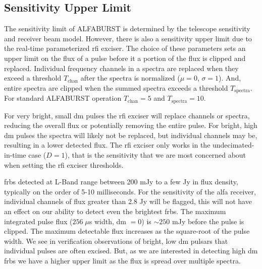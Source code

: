 \documentclass[a4paper,fleqn,usenatbib]{mnras}
\begin{document}
\subsection{Sensitivity Upper Limit}
\label{sec:upper_limit}

The sensitivity limit of ALFABURST is determined by the telescope
sensitivity and receiver beam model. However, there is also a
sensitivity upper limit due to the real-time parameterized \gls{rfi}
exciser. The choice of these parameters sets an upper limit on the
flux of a pulse before it a portion of the flux is clipped and
replaced. Individual frequency channels in a spectra are replaced when
they exceed a threshold $T_{\textrm{chan}}$ after the spectra is
normalized ($\mu=0$, $\sigma=1$). And, entire spectra are clipped when
the summed spectra exceeds a threshold $T_{\textrm{spectra}}$. For
standard ALFABURST operation $T_{\textrm{chan}} = 5$ and
$T_{\textrm{spectra}} = 10$.

For very bright, small \gls{dm} pulses the \gls{rfi} exciser will replace
channels or spectra, reducing the overall flux or potentially removing the
entire pulse.  For bright, high \gls{dm} pulses the spectra will likely not be
replaced, but individual channels may be, resulting in a lower detected flux.
The \gls{rfi} exciser only works in the undecimated-in-time case ($D=1$), that
is the sensitivity that we are most concerned about when setting the \gls{rfi}
exciser thresholds.

\glspl{frb} detected at L-Band range between 200 mJy to a few Jy in flux
density, typically on the order of 5-10 milliseconds. For the sensitivity of the
\gls{alfa} receiver, individual channels of flux greater than 2.8 Jy will be
flagged, this will not have an effect on our ability to detect even the
brightest \glspl{frb}.  The maximum integrated pulse flux ($256 \; \mu$s width,
\gls{dm} $=0$) is $\sim250$ mJy before the pulse is clipped. The maximum
detectable flux increases as the square-root of the pulse width.  We see in
verification observations of bright, low \gls{dm} pulsars that individual
pulses are often excised. But, as we are interested in detecting high \gls{dm}
\glspl{frb} we have a higher upper limit as the flux is spread over multiple
spectra.
\end{document}
